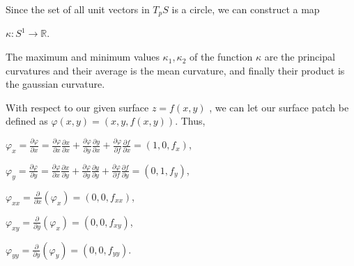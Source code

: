 \documentclass[12pt, a4paper]{article}
\begin{document}
\begin{flushleft}

    Since the set of all unit vectors in $T_pS$ is a circle, we can construct a map\par
    
\vspace{4mm}

        \centerline{$\kappa\colon S^1\rightarrow\mathbb{R}$.}
        
\vspace{4mm}

    The maximum and minimum values $\kappa_1, \kappa_2$ of the function $\kappa$ are the principal curvatures and their average is the mean curvature, and finally their product is the gaussian curvature.\par
    With respect to our given surface $z=f(x,y)$ , we can let our surface patch be defined as $\varphi(x,y)=(x,y,f(x,y))$. Thus,\par
    
\vspace{4mm}

        \centerline{$\varphi_x=\frac{\partial \varphi}{\partial x}=\frac{\partial \varphi}{\partial x}\frac{\partial x}{\partial x}+\frac{\partial\varphi}{\partial y}\frac{\partial y}{\partial x}+\frac{\partial\varphi}{\partial f}\frac{\partial f}{\partial x}=(1,0,f_x)$,}
        
\vspace{2mm}

        \centerline{$\varphi_y=\frac{\partial \varphi}{\partial y}=\frac{\partial \varphi}{\partial x}\frac{\partial x}{\partial y}+\frac{\partial\varphi}{\partial y}\frac{\partial y}{\partial y}+\frac{\partial\varphi}{\partial f}\frac{\partial f}{\partial y}=(0,1,f_y)$,}
        
\vspace{2mm}

        \centerline{$\varphi_{xx}=\frac{\partial}{\partial x}(\varphi_x)=(0,0,f_{xx})$,}
        
\vspace{2mm}

        \centerline{$\varphi_{xy}=\frac{\partial}{\partial y}(\varphi_x)=(0,0,f_{xy})$,}
        
\vspace{2mm}

        \centerline{$\varphi_{yy}=\frac{\partial}{\partial y}(\varphi_y)=(0,0,f_{yy})$.}
        
\vspace{4mm}


\end{flushleft}
\end{document}
